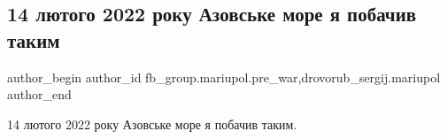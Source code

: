  
 
 
 
 

\subsection{14 лютого 2022 року Азовське море я побачив таким}
\label{sec:13_02_2023.fb.fb_group.mariupol.pre_war.3.14_lyutogo_2022_roku}
 
\ifcmt
 author_begin
   author_id fb_group.mariupol.pre_war,drovorub_sergij.mariupol
 author_end
\fi

14 лютого 2022 року Азовське море я побачив таким.

